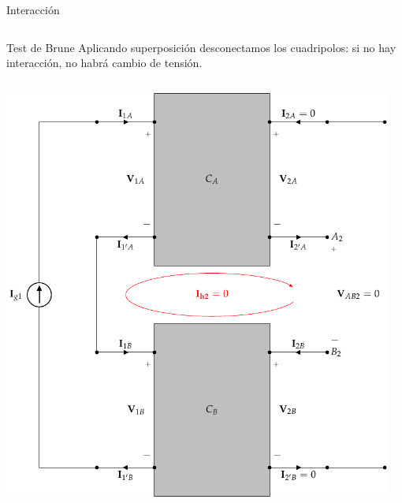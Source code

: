 \documentclass[xcolor={usenames,svgnames,dvipsnames}]{beamer}
\begin{document}
\begin{frame}[label={sec:org0818282},plain]{Interacción}
\begin{columns}
\begin{column}{0.65\columnwidth}
\begin{center}
\end{center}
\end{column}
\end{columns}
\end{frame}

\begin{frame}[label={sec:orgabb371a},plain]{Test de Brune}
Aplicando superposición desconectamos los cuadripolos: \alert{si no hay interacción, no habrá cambio de tensión}.
\begin{columns}
\begin{column}{0.65\columnwidth}
\begin{center}
\includegraphics[width=.9\linewidth]{figs/serie-serie-brune-entrada.pdf}
\end{center}
\end{column}
\begin{column}{0.65\columnwidth}
\begin{center}

\end{center}
\end{column}
\end{columns}
\end{frame}
\end{document}
